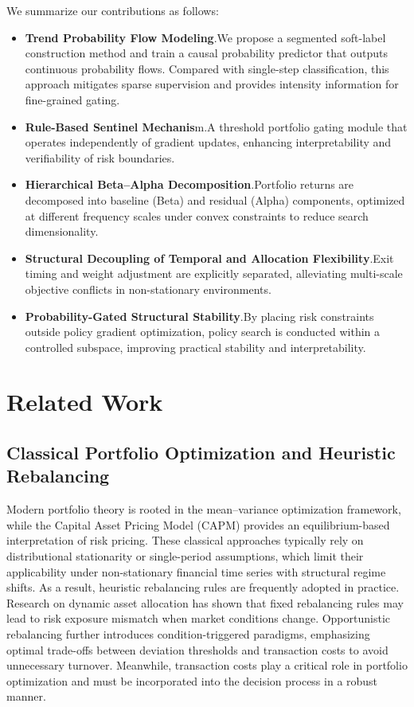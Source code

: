 \documentclass[letterpaper]{article} %
\begin{document}
We summarize our contributions as follows:
\begin{itemize}
    \item \textbf{Trend Probability Flow Modeling}.We propose a segmented soft-label construction method and train a causal probability predictor that outputs continuous probability flows. Compared with single-step classification, this approach mitigates sparse supervision and provides intensity information for fine-grained gating.
    \item \textbf{Rule-Based Sentinel Mechanis}m.A threshold portfolio gating module that operates independently of gradient updates, enhancing interpretability and verifiability of risk boundaries.
    \item \textbf{Hierarchical Beta–Alpha Decomposition}.Portfolio returns are decomposed into baseline (Beta) and residual (Alpha) components, optimized at different frequency scales under convex constraints to reduce search dimensionality.
    \item \textbf{Structural Decoupling of Temporal and Allocation Flexibility}.Exit timing and weight adjustment are explicitly separated, alleviating multi-scale objective conflicts in non-stationary environments.
    \item \textbf{Probability-Gated Structural Stability}.By placing risk constraints outside policy gradient optimization, policy search is conducted within a controlled subspace, improving practical stability and interpretability.
\end{itemize}

\section{Related Work}
\subsection{Classical Portfolio Optimization and Heuristic Rebalancing}
Modern portfolio theory is rooted in the mean--variance optimization framework\citep{MVO}, while the Capital Asset Pricing Model (CAPM) provides an equilibrium-based interpretation of risk pricing\citep{CAMP}. These classical approaches typically rely on distributional stationarity or single-period assumptions, which limit their applicability under non-stationary financial time series with structural regime shifts. As a result, heuristic rebalancing rules are frequently adopted in practice.
Research on dynamic asset allocation has shown that fixed rebalancing rules may lead to risk exposure mismatch when market conditions change\citep{Perold1988DynamicSF}. Opportunistic rebalancing further introduces condition-triggered paradigms, emphasizing optimal trade-offs between deviation thresholds and transaction costs to avoid unnecessary turnover\citep{9}. Meanwhile, transaction costs play a critical role in portfolio optimization and must be incorporated into the decision process in a robust manner\citep{10}.
\end{document}
